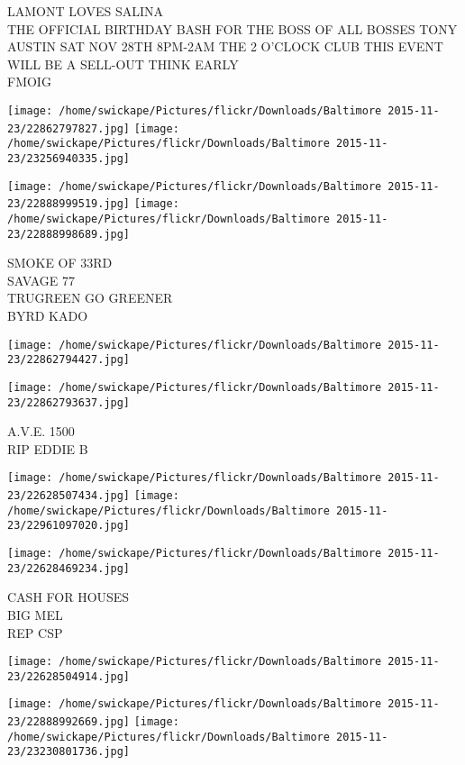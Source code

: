 \documentclass[10pt,letterpaper]{article}
\begin{document}
LAMONT LOVES SALINA\\
THE OFFICIAL BIRTHDAY BASH FOR THE BOSS OF ALL BOSSES TONY AUSTIN SAT NOV 28TH 8PM{-}2AM THE 2 O'CLOCK CLUB THIS EVENT WILL BE A SELL{-}OUT THINK EARLY\\
FMOIG
\pagebreak

\texttt{[image: /home/swickape/Pictures/flickr/Downloads/Baltimore 2015-11-23/22862797827.jpg]}
\texttt{[image: /home/swickape/Pictures/flickr/Downloads/Baltimore 2015-11-23/23256940335.jpg]}

\texttt{[image: /home/swickape/Pictures/flickr/Downloads/Baltimore 2015-11-23/22888999519.jpg]}
\texttt{[image: /home/swickape/Pictures/flickr/Downloads/Baltimore 2015-11-23/22888998689.jpg]}

SMOKE OF 33RD\\
SAVAGE 77\\
TRUGREEN GO GREENER\\
BYRD KADO
\pagebreak

\texttt{[image: /home/swickape/Pictures/flickr/Downloads/Baltimore 2015-11-23/22862794427.jpg]}

\vspace{0.25in}
\texttt{[image: /home/swickape/Pictures/flickr/Downloads/Baltimore 2015-11-23/22862793637.jpg]}

A.V.E. 1500\\
RIP EDDIE B
\pagebreak

\texttt{[image: /home/swickape/Pictures/flickr/Downloads/Baltimore 2015-11-23/22628507434.jpg]}
\texttt{[image: /home/swickape/Pictures/flickr/Downloads/Baltimore 2015-11-23/22961097020.jpg]}

\texttt{[image: /home/swickape/Pictures/flickr/Downloads/Baltimore 2015-11-23/22628469234.jpg]}

CASH FOR HOUSES\\
BIG MEL\\
REP CSP
\pagebreak

\texttt{[image: /home/swickape/Pictures/flickr/Downloads/Baltimore 2015-11-23/22628504914.jpg]}

\vspace{0.25in}
\texttt{[image: /home/swickape/Pictures/flickr/Downloads/Baltimore 2015-11-23/22888992669.jpg]}
\texttt{[image: /home/swickape/Pictures/flickr/Downloads/Baltimore 2015-11-23/23230801736.jpg]}
\end{document}
